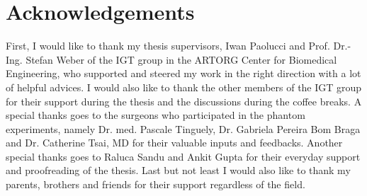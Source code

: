 \chapter*{Acknowledgements}
First, I would like to thank my thesis supervisors, Iwan Paolucci and
  Prof. Dr.-Ing. Stefan Weber of the IGT group in the ARTORG Center for
  Biomedical Engineering, who supported and steered my work in the right
  direction with a lot of helpful advices.
  I would also like to thank the other
  members of the IGT group for their support during the thesis and the discussions
  during the coffee breaks. 
  A special thanks goes to the surgeons who
  participated in the phantom experiments, namely Dr. med. Pascale Tinguely, Dr.
  Gabriela Pereira Bom Braga and Dr. Catherine Tsai, MD for their valuable
  inputs and feedbacks. Another special thanks goes to Raluca Sandu and Ankit
  Gupta for their everyday support and proofreading of the thesis.
 Last but not least I would also like to thank my parents, brothers and friends for their support regardless
of the field.
\endinput
